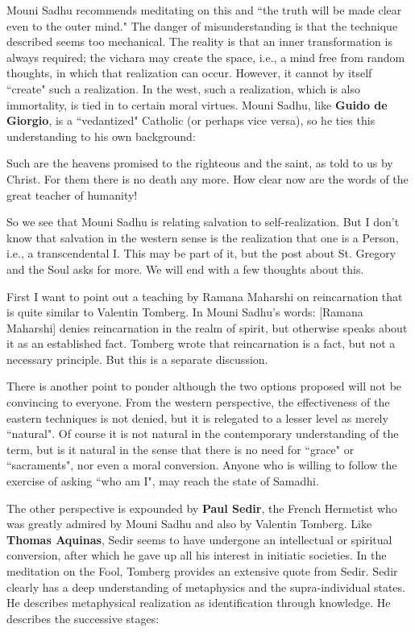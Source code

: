 Mouni Sadhu recommends meditating on this and ``the truth will be made clear even to the outer mind." The danger of misunderstanding is that the technique described seems too mechanical. The reality is that an inner transformation is always required; the vichara may create the space, i.e., a mind free from random thoughts, in which that realization can occur. However, it cannot by itself ``create" such a realization. In the west, such a realization, which is also immortality, is tied in to certain moral virtues. Mouni Sadhu, like \textbf{Guido de Giorgio}, is a ``vedantized" Catholic (or perhaps vice versa), so he ties this understanding to his own background:

\begin{quotex}
Such are the heavens promised to the righteous and the saint, as told to us by Christ. For them there is no death any more. How clear now are the words of the great teacher of humanity! 

\end{quotex}
So we see that Mouni Sadhu is relating salvation to self-realization. But I don't know that salvation in the western sense is the realization that one is a Person, i.e., a transcendental I. This may be part of it, but the post about St. Gregory and the Soul asks for more. We will end with a few thoughts about this.

First I want to point out a teaching by Ramana Maharshi on reincarnation that is quite similar to Valentin Tomberg. In Mouni Sadhu's words: [Ramana Maharshi] denies reincarnation in the realm of spirit, but otherwise speaks about it as an established fact. Tomberg wrote that reincarnation is a fact, but not a necessary principle. But this is a separate discussion.

There is another point to ponder although the two options proposed will not be convincing to everyone. From the western perspective, the effectiveness of the eastern techniques is not denied, but it is relegated to a lesser level as merely ``natural". Of course it is not natural in the contemporary understanding of the term, but is it natural in the sense that there is no need for ``grace" or ``sacraments", nor even a moral conversion. Anyone who is willing to follow the exercise of asking ``who am I", may reach the state of Samadhi.

The other perspective is expounded by \textbf{Paul Sedir}, the French Hermetist who was greatly admired by Mouni Sadhu and also by Valentin Tomberg. Like \textbf{Thomas Aquinas}, Sedir seems to have undergone an intellectual or spiritual conversion, after which he gave up all his interest in initiatic societies. In the meditation on the Fool, Tomberg provides an extensive quote from Sedir. Sedir clearly has a deep understanding of metaphysics and the supra-individual states. He describes metaphysical realization as identification through knowledge. He describes the successive stages:

